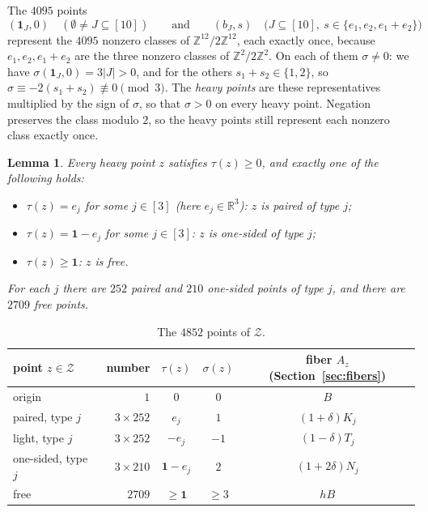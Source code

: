 \documentclass[11pt]{article}
\newtheorem{lemma}[theorem]{Lemma}
\newcommand{\R}{\mathbb{R}}
\newcommand{\Z}{\mathbb{Z}}
\newcommand{\Zcal}{\mathcal{Z}}
\newcommand{\1}{\mathbf{1}}
\begin{document}
The $4095$ points
\[
(\1_J,0)\quad(\emptyset\ne J\subseteq[10])\qquad\text{and}\qquad(b_J,s)\quad\bigl(J\subseteq[10],\ s\in\{e_1,e_2,e_1+e_2\}\bigr)
\]
represent the $4095$ nonzero classes of $\Z^{12}/2\Z^{12}$, each exactly once, because $e_1,e_2,e_1+e_2$ are the three
nonzero classes of $\Z^2/2\Z^2$. On each of them $\sigma\ne0$: we have $\sigma(\1_J,0)=3|J|>0$, and for the others
$s_1+s_2\in\{1,2\}$, so $\sigma\equiv-2(s_1+s_2)\not\equiv0\pmod3$. The \emph{heavy points} are these representatives
multiplied by the sign of $\sigma$, so that $\sigma>0$ on every heavy point. Negation preserves the class modulo $2$, so the
heavy points still represent each nonzero class exactly once.

\begin{lemma}\label{lem:census}
Every heavy point $z$ satisfies $\tau(z)\ge0$, and exactly one of the following holds:
\begin{itemize}
\item $\tau(z)=e_j$ for some $j\in[3]$ (here $e_j\in\R^3$): $z$ is \emph{paired} of type $j$;
\item $\tau(z)=\1-e_j$ for some $j\in[3]$: $z$ is \emph{one-sided} of type $j$;
\item $\tau(z)\ge\1$: $z$ is \emph{free}.
\end{itemize}
For each $j$ there are $252$ paired and $210$ one-sided points of type $j$, and there are $2709$ free points.
\end{lemma}

\begin{table}[t]
\centering
\begin{tabular}{lrccc}
\toprule
point $z\in\Zcal$ & number & $\tau(z)$ & $\sigma(z)$ & fiber $A_z$ (Section~\ref{sec:fibers})\\
\midrule
origin & $1$ & $0$ & $0$ & $B$\\
paired, type $j$ & $3\times252$ & $e_j$ & $1$ & $(1+\delta)K_j$\\
light, type $j$ & $3\times252$ & $-e_j$ & $-1$ & $(1-\delta)T_j$\\
one-sided, type $j$ & $3\times210$ & $\1-e_j$ & $2$ & $(1+2\delta)N_j$\\
free & $2709$ & $\ge\1$ & $\ge3$ & $hB$\\
\bottomrule
\end{tabular}
\caption{The $4852$ points of $\Zcal$.}
\label{tab:points}
\end{table}
\end{document}
